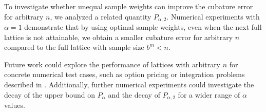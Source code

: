 \documentclass[authoryear]{elsarticle}
\begin{document}
To investigate whether unequal sample weights can improve the cubature error for arbitrary $n$, we analyzed a related quantity $P_{\alpha,2}$. Numerical experiments with $\alpha=1$ 
demonstrate that by using optimal sample weights, even when the next full lattice is not attainable, we obtain a smaller cubature error for arbitrary $n$ compared to the full lattice with sample size $b^m < n$. 


Future work could explore the performance of lattices with arbitrary $n$ for concrete numerical test cases, such as option pricing or integration problems described in \cite[Integration]{simulationlib}. Additionally, further numerical experiments could investigate the decay of the upper bound on $P_\alpha$ and the decay of $P_{\alpha,2}$ for a wider range of $\alpha$ values. 




\end{document}
